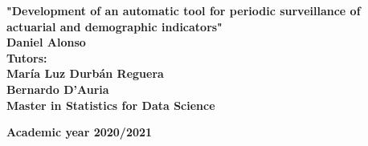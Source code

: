 \documentclass[a4paper,12pt]{article}
\begin{document}
	\begin{titlepage}
	\begin{center}
	\linespread{2}\selectfont\bfseries{\LARGE "Development of an automatic tool for periodic surveillance of actuarial and demographic indicators"}
	\\[5 cm]
	\textbf{\large Daniel Alonso}\\[0.6cm]
	\textbf{Tutors:}\\[0.01cm]
	\textbf{\large María Luz Durbán Reguera \\ Bernardo D'Auria}\\[0.7 cm]
	\textbf{\large Master in Statistics for Data Science}\\[0.3 cm]
	\begin{figure}[H]
		\centering
	\end{figure}
	\textbf{\large Academic year 2020/2021}    
	\end{center}
	\end{titlepage} 
\end{document}
